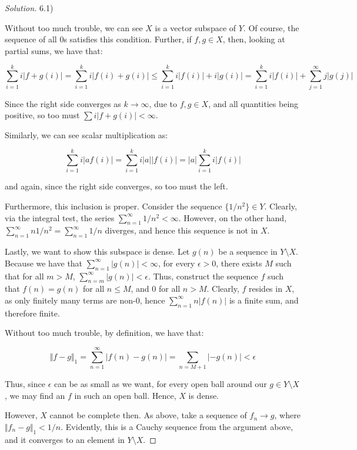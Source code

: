 \documentclass[10pt]{article}
\begin{document}
\begin{proof}[Solution]

6.1)

Without too much trouble, we can see $X$ is a vector subspace of $Y$. Of course, the sequence of all 0s satisfies this condition. Further, if $f, g \in X$, then, looking at partial sums, we have that:

$$ \sum_{i=1}^k i|f + g(i) | = \sum_{i=1}^k i | f(i) + g(i) | \leq \sum_{i=1}^k i | f(i)| + i|g(i)| = \sum_{i=1}^k i |f(i)| + \sum_{j=1}^\infty j | g(j) |$$  

Since the right side converges as $ k \to \infty$, due to $f, g \in X$, and all quantities being positive, so too must $\sum i |f + g(i)| < \infty$.

Similarly, we can see scalar multiplication as:

$$ \sum_{i=1}^k i |af(i)| = \sum_{i=1}^k i |a| |f(i)| = |a| \sum_{i=1}^k i |f(i)|$$

and again, since the right side converges, so too must the left.

Furthermore, this inclusion is proper. Consider the sequence $\{ 1/n^2 \} \in Y$. Clearly, via the integral test, the series $\sum_{n=1}^\infty 1/n^2 < \infty$. However, on the other hand, $\sum_{n=1}^\infty n 1/n^2 = \sum_{n=1}^\infty 1/n$ diverges, and hence this sequence is not in $X$.

Lastly, we want to show this subspace is dense. Let $g(n)$ be a sequence in $Y \setminus X$. Because we have that $\sum_{n=1}^\infty |g(n)| < \infty$, for every $\epsilon > 0$, there exists $M$ such that for all $m > M$, $\sum_{n=m}^\infty |g(n)| < \epsilon$. Thus, construct the sequence $f$ such that $f(n) = g(n)$ for all $n \leq M$, and $0$ for all $n > M$. Clearly, $f$ resides in $X$, as only finitely many terms are non-0, hence $\sum_{n=1}^\infty n |f(n)|$ is a finite sum, and therefore finite.

Without too much trouble, by definition, we have that:

$$ \Vert f - g \Vert_1 = \sum_{n=1}^\infty |f(n) - g(n)| = \sum_{n=M+1} | -g(n)| < \epsilon $$

Thus, since $\epsilon$ can be as small as we want, for every open ball around our $g \in Y \setminus X$, we may find an $f$ in such an open ball. Hence, $X$ is dense.

However, $X$ cannot be complete then. As above, take a sequence of $f_n \to g$, where $\Vert f_n - g \Vert_1 < 1/n$. Evidently, this is a Cauchy sequence from the argument above, and it converges to an element in $Y \setminus X$.


\end{proof}
\end{document}
